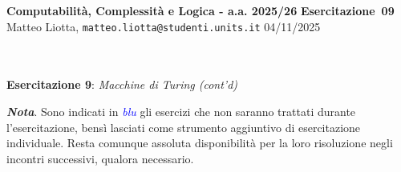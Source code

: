 \documentclass[a4paper,10pt]{article}
\makeatletter
\newcommand{\EsercitazioneNum}{09}
\newcommand{\Data}{04/11/2025}
\newcommand{\DocType}{Esercitazione} %
\newcommand{\FullTitle}{\DocType\ \EsercitazioneNum}
\newcommand{\Header}{
\noindent
  \small \textbf{Computabilità, Complessità e Logica - a.a. 2025/26} \hfill \textbf{\FullTitle} \\[0.2cm]
  \scriptsize Matteo Liotta, \texttt{matteo.liotta@studenti.units.it} \hfill \Data \\[0.2cm]
  \noindent\makebox[\linewidth]{\rule{\linewidth}{0.4pt}} \\[0.3cm]}
\makeatother
\begin{document}
\footnotesize  %
\Header\\[0.7cm]





\noindent\Large \textbf{Esercitazione 9}: \textit{Macchine di Turing (cont'd)}
\begin{osservazioni}
    \textbf{\textit{Nota}}. Sono indicati in \textcolor{blue}{\textit{blu}} gli esercizi che non saranno trattati durante l'esercitazione, bensì lasciati come strumento aggiuntivo di esercitazione individuale. Resta comunque assoluta disponibilità per la loro risoluzione negli incontri successivi, qualora necessario.
\end{osservazioni}
\end{document}
